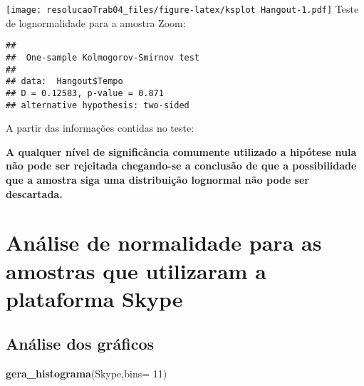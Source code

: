 \documentclass[
]{article}
\newenvironment{Shaded}{\begin{snugshade}}{\end{snugshade}}
\newcommand{\DataTypeTok}[1]{\textcolor[rgb]{0.13,0.29,0.53}{#1}}
\newcommand{\DecValTok}[1]{\textcolor[rgb]{0.00,0.00,0.81}{#1}}
\newcommand{\KeywordTok}[1]{\textcolor[rgb]{0.13,0.29,0.53}{\textbf{#1}}}
\newcommand{\NormalTok}[1]{#1}
\newcommand{\OperatorTok}[1]{\textcolor[rgb]{0.81,0.36,0.00}{\textbf{#1}}}
\newcommand{\StringTok}[1]{\textcolor[rgb]{0.31,0.60,0.02}{#1}}
\begin{document}
\texttt{[image: resolucaoTrab04\_files/figure-latex/ksplot Hangout-1.pdf]}
Teste de lognormalidade para a amostra Zoom:

\begin{Shaded}
\end{Shaded}

\begin{verbatim}
## 
##  One-sample Kolmogorov-Smirnov test
## 
## data:  Hangout$Tempo
## D = 0.12583, p-value = 0.871
## alternative hypothesis: two-sided
\end{verbatim}

A partir das informações contidas no teste:

\textbf{A qualquer nível de significância comumente utilizado a hipótese
nula não pode ser rejeitada chegando-se a conclusão de que a
possibilidade que a amostra siga uma distribuição lognormal não pode ser
descartada.}

\hypertarget{anuxe1lise-de-normalidade-para-as-amostras-que-utilizaram-a-plataforma-skype}{%
\section{Análise de normalidade para as amostras que utilizaram a
plataforma
Skype}\label{anuxe1lise-de-normalidade-para-as-amostras-que-utilizaram-a-plataforma-skype}}

\hypertarget{anuxe1lise-dos-gruxe1ficos-2}{%
\subsection{Análise dos gráficos}\label{anuxe1lise-dos-gruxe1ficos-2}}

\begin{Shaded}
\begin{Highlighting}[]
\KeywordTok{gera_histograma}\NormalTok{(Skype,}\DataTypeTok{bins=} \DecValTok{11}\NormalTok{)}
\end{Highlighting}
\end{Shaded}
\end{document}
